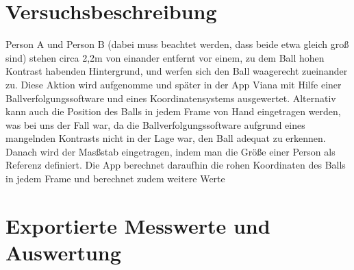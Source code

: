 \documentclass[8pt, letterpaper]{article}
\begin{document}
\section{Versuchsbeschreibung}
Person A und Person B (dabei muss beachtet werden, dass beide etwa gleich groß sind) stehen circa 2,2m von einander entfernt vor einem, zu dem Ball hohen Kontrast habenden Hintergrund, und werfen sich den Ball waagerecht zueinander zu. Diese Aktion wird aufgenomme und später in der App Viana mit Hilfe einer Ballverfolgungssoftware und eines Koordinatensystems ausgewertet. Alternativ kann auch die Position des Balls in jedem Frame von Hand eingetragen werden, was bei uns der Fall war, da die Ballverfolgungssoftware aufgrund eines mangelnden Kontrasts nicht in der Lage war, den Ball adequat zu erkennen. Danach wird der Masßstab eingetragen, indem man die Größe einer Person als Referenz definiert. Die App berechnet daraufhin die rohen Koordinaten des Balls in jedem Frame und berechnet zudem weitere Werte

\section{Exportierte Messwerte und Auswertung}

\begin{figure}[!htb]
\centering
{}
\end{figure}
\end{document}
